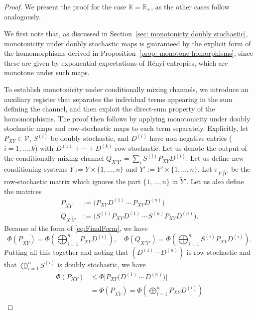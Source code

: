 \documentclass[aps,pra,11pt,onecolumn,nofootinbib,tightenlines]{revtex4-2}
\theoremstyle{definition}
\newcommand{\V}{\mathcal{V}}
\begin{document}
\begin{proof}
We present the proof for the case $\mathbb{K} = \mathbb{R}_+$, as the other cases follow analogously.

We first note that, as discussed in Section~\ref{sec: monotonicty doubly stochastic},
monotonicity under doubly stochastic maps is guaranteed by the explicit form of
the homomorphisms derived in Proposition~\ref{prop: monotone homorphisms}, since
these are given by exponential expectations of R\'enyi entropies, which are
monotone under such maps.


To establish monotonicity under conditionally mixing channels, we introduce an auxiliary register that separates the individual terms appearing in the sum defining the channel, and then exploit the direct-sum property of the homomorphisms. The proof then follows by applying monotonicity under doubly stochastic maps and row-stochastic maps to each term separately.
Explicitly, let $P_{XY}\in\V$, $S^{(i)}$ be doubly stochastic, and $D^{(i)}$ have non-negative entries ($i=1,\ldots,k$) with $D^{(1)}+\cdots+D^{(k)}$ row-stochastic. Let us denote the output of the conditionally mixing channel $Q_{X'Y'}=\sum_i S^{(i)}P_{XY}D^{(i)}$. Let us define new conditioning systems $\widetilde{Y}:=Y\times\{1,\ldots,n\}$ and $\widetilde{Y}':=Y'\times\{1,\ldots,n\}$. 
Let $\pi_{Y'|\widetilde{Y}'}$ be the row-stochastic matrix which ignores the part $\{1,\ldots,n\}$ in $\widetilde{Y}'$. Let us also define the matrices
\begin{align}
P_{X\widetilde{Y}}&:=\big(P_{XY}D^{(1)}\,\cdots\,P_{XY}D^{(n)}\big)\\
Q_{X'\widetilde{Y}'}&:=\big(S^{(1)}P_{XY}D^{(1)}\,\cdots\,S^{(n)}P_{XY}D^{(n)}\big).
\end{align}
Because of the form of \eqref{eq:FinalForm}, %
we have
\begin{equation}
\Phi(P_{X\widetilde{Y}})=\Phi\left(\bigoplus_{i=1}^n P_{XY}D^{(i)}\right),\quad\Phi(Q_{X'\widetilde{Y}'})=\Phi\left(\bigoplus_{i=1}^n S^{(i)}P_{XY}D^{(i)}\right).
\end{equation}
Putting all this together and noting that $(D^{(1)}\,\cdots D^{(n)})$ is row-stochastic and that $\bigoplus_{i=1}^n S^{(i)}$ is doubly stochastic, we have
\begin{align}
\Phi(P_{XY})&\leq\Phi\big[P_{XY}\big(D^{(1)}\,\cdots\,D^{(n)}\big)\big]\\
&=\Phi(P_{X\widetilde{Y}})=\Phi\left(\bigoplus_{i=1}^n P_{XY}D^{(i)}\right)\\

\end{align}
\end{proof}
\end{document}
